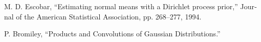 \documentclass{article}
\begin{document}
\renewcommand*{\refname}{\section{منابع}}
\begin{thebibliography}{9}
\begin{latin}

M. D. Escobar, “Estimating normal means with a Dirichlet process prior,” Journal of the American Statistical Association, pp. 268–277, 1994.

P. Bromiley, “Products and Convolutions of Gaussian Distributions.”

\end{latin}
\end{thebibliography}
\end{document}
